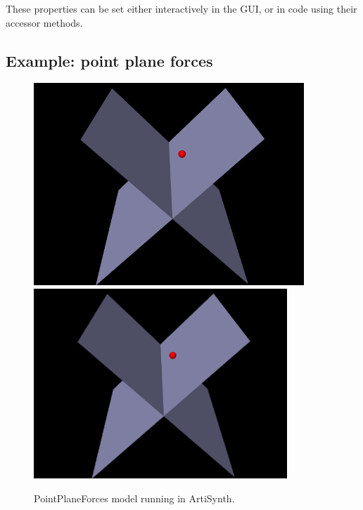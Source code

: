 These properties can be set either interactively in the GUI, or in code using
their accessor methods.

\subsection{Example: point plane forces}

\begin{figure}[h]
\begin{center}
\iflatexml
 \includegraphics[]{images/PointPlaneForces}
\else
 \includegraphics[width=3.75in]{images/PointPlaneForces}
\fi
\end{center}
\caption{PointPlaneForces model running in ArtiSynth.}
\label{PointPlaneForces:fig}
\end{figure}

